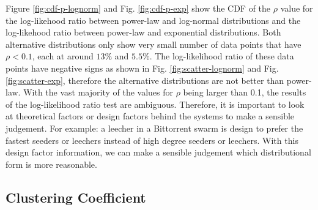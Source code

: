 \documentclass[paper]{ieice}
\begin{document}
Figure \ref{fig:cdf-p-lognorm} and Fig. \ref{fig:cdf-p-exp} show the CDF of the $\rho$ value for the log-likehood ratio between power-law and log-normal distributions and the log-likehood ratio between power-law and exponential distributions.
Both alternative distributions only show very small number of data points that have $\rho < 0.1$, each at around $13\%$ and $5.5\%$.
The log-likelihood ratio of these data points have negative signs as shown in Fig. \ref{fig:scatter-lognorm} and Fig. \ref{fig:scatter-exp}, therefore the alternative distributions are not better than power-law.
With the vast majority of the values for $\rho$ being larger than 0.1, the results of the log-likelihood ratio test are ambiguous. 
Therefore, it is important to look at theoretical factors or design factors behind the systems to make a sensible judgement.
For example: a leecher in a Bittorrent swarm is design to prefer the fastest seeders or leechers instead of high degree seeders or leechers. 
With this design factor information, we can make a sensible judgement which distributional form is more reasonable.


\subsection{Clustering Coefficient}\label{clusteringcoef}
\end{document}
